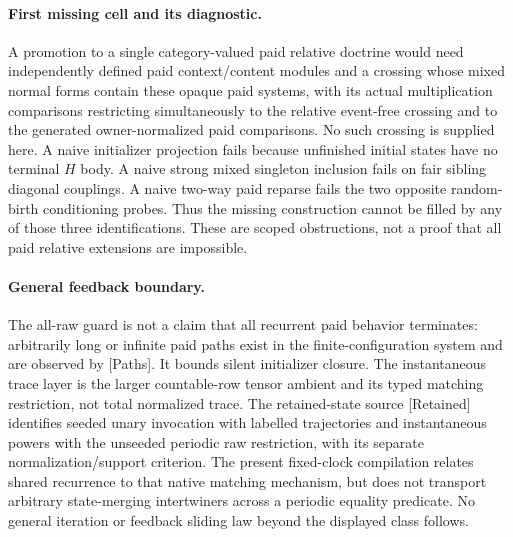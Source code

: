 \documentclass[11pt]{article}
\begin{document}
\paragraph{First missing cell and its diagnostic.} A promotion to a single category-valued paid relative doctrine would need independently defined paid context/content modules and a crossing whose mixed normal forms contain these opaque paid systems, with its actual multiplication comparisons restricting simultaneously to the relative event-free crossing and to the generated owner-normalized paid comparisons. No such crossing is supplied here. A naive initializer projection fails because unfinished initial states have no terminal $H$ body. A naive strong mixed singleton inclusion fails on fair sibling diagonal couplings. A naive two-way paid reparse fails the two opposite random-birth conditioning probes. Thus the missing construction cannot be filled by any of those three identifications. These are scoped obstructions, not a proof that all paid relative extensions are impossible.

\paragraph{General feedback boundary.} The all-raw guard is not a claim that all recurrent paid behavior terminates: arbitrarily long or infinite paid paths exist in the finite-configuration system and are observed by [Paths]. It bounds silent initializer closure. The instantaneous trace layer is the larger countable-row tensor ambient and its typed matching restriction, not total normalized trace. The retained-state source [Retained] identifies seeded unary invocation with labelled trajectories and instantaneous powers with the unseeded periodic raw restriction, with its separate normalization/support criterion. The present fixed-clock compilation relates shared recurrence to that native matching mechanism, but does not transport arbitrary state-merging intertwiners across a periodic equality predicate. No general iteration or feedback sliding law beyond the displayed class follows.
\end{document}

